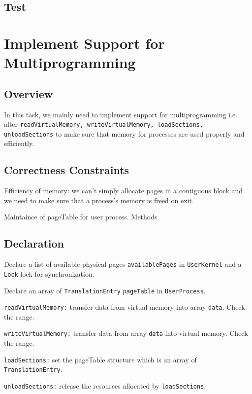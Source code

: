 \documentclass{article}
\begin{document}
\subsection{Test}

\section{Implement Support for Multiprogramming}
\subsection{Overview}
In this task, we mainly need to implement support for multiprogramming i.e. alter \texttt{readVirtualMemory, writeVirtualMemory, loadSections,
unloadSections} to make sure that memory for processes are used properly and efficiently.
\subsection{Correctness Constraints}
\begin{compactitem}
\item Efficiency of memory: we can't simply allocate pages in a contiguous block and we need to make sure that a process's memory is freed on exit.
\item Maintaince of pageTable for user process. Methods 
\end{compactitem}
\subsection{Declaration} 
\begin{compactitem}
\item Declare a list of available physical pages \texttt{availablePages} in \texttt{UserKernel} and a \texttt{Lock} lock for synchronization.
\item Declare an array of \texttt{TranslationEntry} \texttt{pageTable} in \texttt{UserProcess}.
\item \texttt{readVirtualMemory:} transfer data from virtual memory into array \texttt{data}. Check the range.
\item \texttt{writeVirtualMemory:} transfer data from array \texttt{data} into virtual memory. Check the range.
\item \texttt{loadSections:} set the pageTable structure which is an array of \texttt{TranslationEntry}.
\item \texttt{unloadSections:} release the resources allocated by \texttt{loadSections}.
\end{compactitem}
\end{document}
